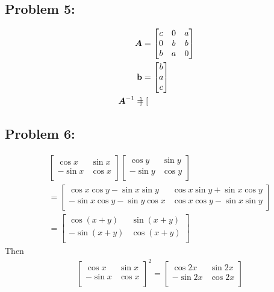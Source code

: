 \documentclass{article}
\begin{document}
\hypertarget{}{}
\subsection*{{Problem 5: }}
\label{}
\begin{align*}
\boldsymbol{A} &= \begin{bmatrix} c & 0 & a \\ 0 & b & b \\ b & a & 0  \end{bmatrix} \\
\boldsymbol{\mathrm{b}} &= \begin{bmatrix} b \\ a \\ c  \end{bmatrix} \\
\boldsymbol{A}^{-1} = \begin{bmatrix}  \end{bmatrix}  
\end{align*}


\hypertarget{}{}
\subsection*{{Problem 6: }}
\label{}
\begin{align*} 
&\left[   \begin{array}{cc} 
\cos x & \sin x \\ 
-\sin x & \cos x \\ 
\end{array}  \right] \left[ \begin{array}{cc}
\cos y & \sin y \\ 
-\sin y & \cos y \\ 
\end{array}  \right] \\&= \left[   \begin{array}{cc} 
\cos x\cos y -\sin x\sin y & \cos x\sin y + \sin x\cos y \\ 
-\sin x\cos y-\sin y\cos x &\cos x\cos y -\sin x\sin y\\ 
\end{array}  \right] \\&= \left[   \begin{array}{cc} 
\cos (x+y) & \sin (x+y) \\ 
-\sin (x+y) & \cos (x+y) \\ 
\end{array}  \right]
\end{align*}
Then \begin{align*} 
&\left[   \begin{array}{cc} 
\cos x & \sin x \\ 
-\sin x & \cos x \\ 
\end{array}  \right]^2 = \left[   \begin{array}{cc} 
\cos 2x & \sin 2x \\ 
-\sin 2x & \cos 2x \\ 
\end{array}  \right]
\end{align*}
\end{document}
